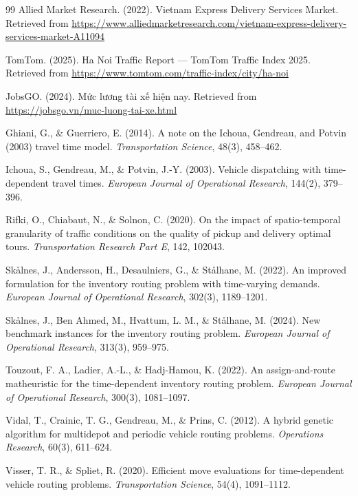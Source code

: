 \documentclass[12pt,a4paper]{article}
\begin{document}
\begin{thebibliography}{99}
Allied Market Research. (2022).
Vietnam Express Delivery Services Market.
Retrieved from \url{https://www.alliedmarketresearch.com/vietnam-express-delivery-services-market-A11094}

TomTom. (2025).
Ha Noi Traffic Report --- TomTom Traffic Index 2025.
Retrieved from \url{https://www.tomtom.com/traffic-index/city/ha-noi}

JobsGO. (2024).
Mức lương tài xế hiện nay.
Retrieved from \url{https://jobsgo.vn/muc-luong-tai-xe.html}

Ghiani, G., \& Guerriero, E. (2014).
A note on the Ichoua, Gendreau, and Potvin (2003) travel time model.
\textit{Transportation Science}, 48(3), 458--462.

Ichoua, S., Gendreau, M., \& Potvin, J.-Y. (2003).
Vehicle dispatching with time-dependent travel times.
\textit{European Journal of Operational Research}, 144(2), 379--396.

Rifki, O., Chiabaut, N., \& Solnon, C. (2020).
On the impact of spatio-temporal granularity of traffic conditions on the quality of pickup and delivery optimal tours.
\textit{Transportation Research Part E}, 142, 102043.

Skålnes, J., Andersson, H., Desaulniers, G., \& Stålhane, M. (2022).
An improved formulation for the inventory routing problem with time-varying demands.
\textit{European Journal of Operational Research}, 302(3), 1189--1201.

Skålnes, J., Ben Ahmed, M., Hvattum, L. M., \& Stålhane, M. (2024).
New benchmark instances for the inventory routing problem.
\textit{European Journal of Operational Research}, 313(3), 959--975.

Touzout, F. A., Ladier, A.-L., \& Hadj-Hamou, K. (2022).
An assign-and-route matheuristic for the time-dependent inventory routing problem.
\textit{European Journal of Operational Research}, 300(3), 1081--1097.

Vidal, T., Crainic, T. G., Gendreau, M., \& Prins, C. (2012).
A hybrid genetic algorithm for multidepot and periodic vehicle routing problems.
\textit{Operations Research}, 60(3), 611--624.

Visser, T. R., \& Spliet, R. (2020).
Efficient move evaluations for time-dependent vehicle routing problems.
\textit{Transportation Science}, 54(4), 1091--1112.

\end{thebibliography}
\end{document}
